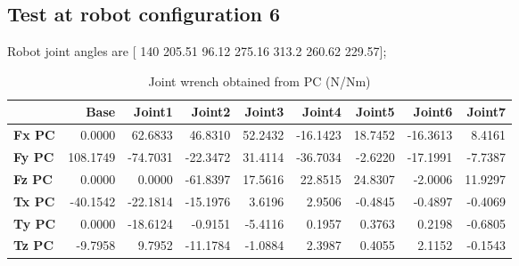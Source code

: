
\subsection{Test at robot configuration 6}
Robot joint angles are  [ 140        205.51         96.12        275.16         313.2        260.62        229.57];

\begin{table}[h!]
	\centering
	\caption{Joint wrench obtained from PC (N/Nm)}
	\label{wrech_PC_Pose6}
	\begin{tabular}{|l|r|r|r|r|r|r|r|r|}
		\hline
		\textbf{}  & \textbf{Base} & \textbf{Joint1}  & \textbf{Joint2}  & \textbf{Joint3}  & \textbf{Joint4}  & \textbf{Joint5}  & \textbf{Joint6}  & \textbf{Joint7} \\ \hline
		\textbf{Fx PC}  & 0.0000        & 62.6833        & 46.8310        & 52.2432        & -16.1423        & 18.7452        & -16.3613        & 8.4161 \\ \hline
		\textbf{Fy PC}  & 108.1749        & -74.7031        & -22.3472        & 31.4114        & -36.7034        & -2.6220        & -17.1991        & -7.7387 \\ \hline
		\textbf{Fz PC}  & 0.0000        & 0.0000        & -61.8397        & 17.5616        & 22.8515        & 24.8307        & -2.0006        & 11.9297 \\ \hline
		\textbf{Tx PC}  & -40.1542        & -22.1814        & -15.1976        & 3.6196        & 2.9506        & -0.4845        & -0.4897        & -0.4069 \\ \hline
		\textbf{Ty PC}  & 0.0000        & -18.6124        & -0.9151        & -5.4116        & 0.1957        & 0.3763        & 0.2198        & -0.6805 \\ \hline
		\textbf{Tz PC}  & -9.7958        & 9.7952        & -11.1784        & -1.0884        & 2.3987        & 0.4055        & 2.1152        & -0.1543 \\ \hline
	\end{tabular}
\end{table}

